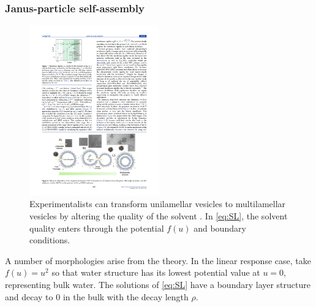 \subsubsection{Janus-particle self-assembly} 
\begin{figure}
\includegraphics[width=0.5\textwidth]{figures/SpecificAim1/multilamelar.pdf}
\caption{\label{fig:multilamelar}
  Experimentalists can transform unilamellar vesicles to multilamellar
  vesicles by altering the quality of the solvent
    \cite{deMeetal21}.
  In \eqref{eq:SL}, the solvent quality enters through the potential
  $f(u)$ and boundary conditions. 
}
\end{figure}
A number of morphologies arise from the theory. In the linear response case,
take $f(u) = u^2$ so that water structure has its lowest potential value
at $u = 0$, representing bulk water. The solutions of \eqref{eq:SL} have
a boundary layer structure and decay to 0 in the bulk with the decay
length $\rho$.

